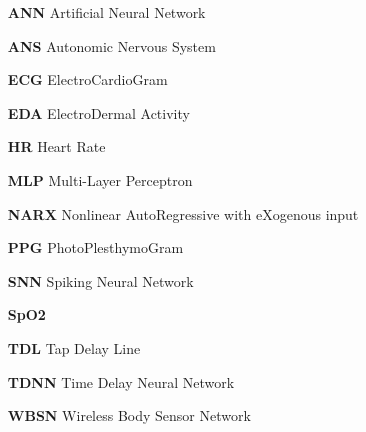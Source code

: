  
\begin{itemize} 

\item[\textbf{ANN}] Artificial Neural Network
\item[\textbf{ANS}] Autonomic Nervous System
\item[\textbf{ECG}] ElectroCardioGram
\item[\textbf{EDA}] ElectroDermal Activity
\item[\textbf{HR}] Heart Rate
\item[\textbf{MLP}] Multi-Layer Perceptron
\item[\textbf{NARX}] Nonlinear AutoRegressive with eXogenous input
\item[\textbf{PPG}] PhotoPlesthymoGram
\item[\textbf{SNN}] Spiking Neural Network
\item[\textbf{SpO2}] 
\item[\textbf{TDL}] Tap Delay Line
\item[\textbf{TDNN}] Time Delay Neural Network
\item[\textbf{WBSN}] Wireless Body Sensor Network

\end{itemize} 

